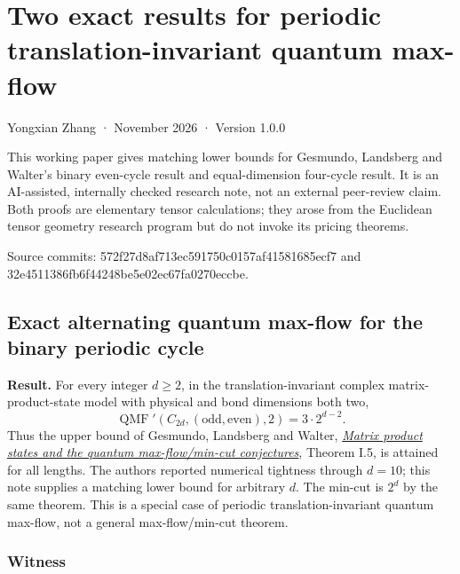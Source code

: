 \documentclass[
  11pt,
]{article}
\author{}
\date{}
\begin{document}
\section{Two exact results for periodic translation-invariant quantum
max-flow}\label{two-exact-results-for-periodic-translation-invariant-quantum-max-flow}

Yongxian Zhang · November 2026 · Version 1.0.0

This working paper gives matching lower bounds for Gesmundo, Landsberg
and Walter's binary even-cycle result and equal-dimension four-cycle
result. It is an AI-assisted, internally checked research note, not an
external peer-review claim. Both proofs are elementary tensor
calculations; they arose from the Euclidean tensor geometry research
program but do not invoke its pricing theorems.

Source commits: 572f27d8af713ec591750c0157af41581685ecf7 and
32e4511386fb6f44248be5e02ec67fa0270eccbe.

\subsection{Exact alternating quantum max-flow for the binary periodic
cycle}\label{exact-alternating-quantum-max-flow-for-the-binary-periodic-cycle}

\textbf{Result.} For every integer \(d\ge 2\), in the
translation-invariant complex matrix-product-state model with physical
and bond dimensions both two, \[
  \operatorname{QMF}'(C_{2d},(\mathrm{odd},\mathrm{even}),2)=3\cdot 2^{d-2}.
\] Thus the upper bound of Gesmundo, Landsberg and Walter,
\href{https://arxiv.org/abs/1801.09106}{\emph{Matrix product states and
the quantum max-flow/min-cut conjectures}}, Theorem I.5, is attained for
all lengths. The authors reported numerical tightness through \(d=10\);
this note supplies a matching lower bound for arbitrary \(d\). The
min-cut is \(2^d\) by the same theorem. This is a special case of
periodic translation-invariant quantum max-flow, not a general
max-flow/min-cut theorem.

\subsubsection{Witness}\label{witness}
\end{document}
